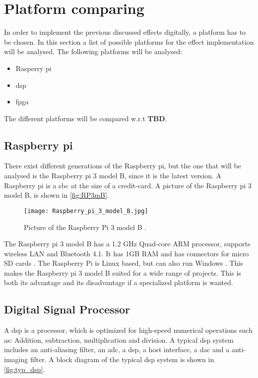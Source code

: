 \section{Platform comparing}
In order to implement the previous discussed effects digitally, a platform has to be chosen. In this section a list of possible platforms for the effect implementation will be analysed. The following platforms will be analysed:

\begin{itemize}
\item Rasperry pi
\item \gls{dsp}
\item \gls{fpga}
\end{itemize}

The different platforms will be compared w.r.t \textbf{TBD}.

\subsection{Raspberry pi}
There exist different generations of the Raspberry pi, but the one that will be analysed is the Raspberry pi 3 model B, since it is the latest version. 
A Raspberry pi is a \gls{sbc} at the size of a credit-card. A picture of the Raspberry pi 3 model B, is shown in \autoref{fig:RP3mB}.

\begin{figure}[h]
	\centering
		\texttt{[image: Raspberry\_pi\_3\_model\_B.jpg]}
		\caption{Picture of the Raspberry Pi 3 model B \cite{Raspberry_pi}.}
		\label{fig:RP3mB}
\end{figure}

The Raspberry pi 3 model B has a 1.2 GHz Quad-core ARM processor, supports wireless LAN and Bluetooth 4.1. It has 1GB RAM and has connectors for micro SD cards \cite{Raspberry_pi}.
The Raspberry Pi is Linux based, but can also run Windows \cite{sparkfun_Raspberry_pi}. This makes the Raspberry pi 3 model B suited for a wide range of projects. This is both its advantage and its disadvantage if a specialized platform is wanted. 

\subsection{Digital Signal Processor}
A \gls{dsp} is a processor, which is optimized for high-speed numerical operations such as: Addition, subtraction, multiplication and division. A typical \gls{dsp} system includes an anti-aliasing filter, an \gls{adc}, a \gls{dsp}, a host interface, a \gls{dac} and a anti-imaging filter. A block diagram of the typical \gls{dsp} system is shown in \autoref{fig:typ_dsp}.


